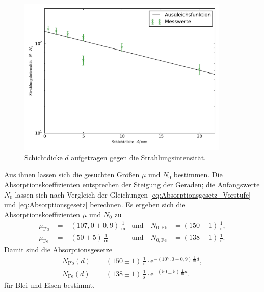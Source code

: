 \begin{figure}[h]
	\centering
	\includegraphics[width=0.9\textwidth]{Bilder/Eisen.pdf}
	\caption{Schichtdicke $d$ aufgetragen gegen die Strahlungsintensität.}
	\label{fig:eisen}
\end{figure}

Aus ihnen lassen sich die gesuchten Größen $\mu$ und $N_0$ bestimmen. 
Die Absorptionskoeffizienten entsprechen der Steigung der Geraden; die Anfangswerte $N_0$ lassen sich nach Vergleich der Gleichungen \eqref{eq:Absorptionsgesetz_Vorstufe} und \eqref{eq:Absorptionsgesetz} berechnen.
Es ergeben sich die Absorptionskoeffizienten $\mu$ und $N_0$ zu
\begin{align}
\mu_\mathup{Pb}&=-(107,0\pm0,9)\,\frac{1}{\si\meter} &\text{und}\quad  N_{0\mathup{,Pb}}&=(150\pm1)\,\frac{1}{\si\second},\\
\mu_\mathup{Fe}&=-(50\pm5)\,\frac{1}{\si\meter}  &\text{und}\quad  N_{0\mathup{,Fe}}&=(138\pm1)\,\frac{1}{\si\second}.
\end{align}
Damit sind die Absorptionsgesetze
\begin{align}
N_\mathup{Pb}(d)&=(150\pm1)\,\frac{1}{\si\second}\cdot\mathup{e}^{-(107,0\pm0,9)\,\frac{1}{\si\meter}d},\\
N_\mathup{Fe}(d)&=(138\pm1)\,\frac{1}{\si\second}\cdot\mathup{e}^{-(50\pm5)\,\frac{1}{\si\meter}d}.
\end{align}
 für Blei und Eisen bestimmt.

